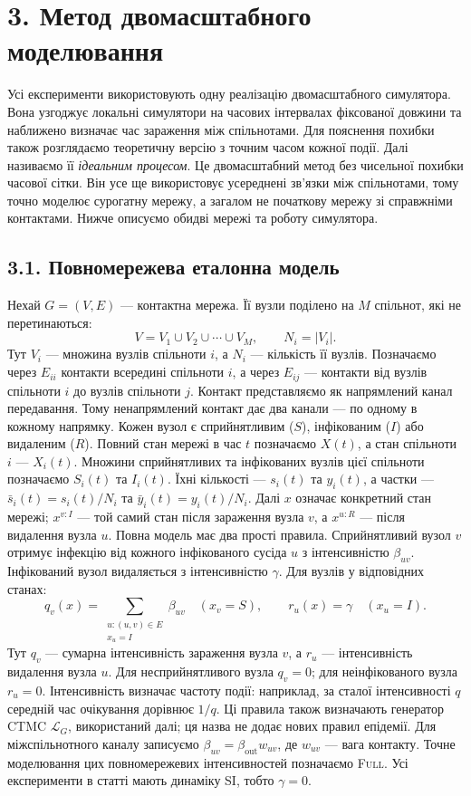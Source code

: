 ﻿\documentclass[11pt,a4paper]{article}
\newcommand{\ibar}{\bar{y}}
\newcommand{\sbar}{\bar{s}}
\newcommand{\Full}{\textup{\textsc{Full}}}
\begin{document}
\section*{3. Метод двомасштабного моделювання}
Усі експерименти використовують одну реалізацію двомасштабного симулятора. Вона узгоджує локальні симулятори на часових інтервалах фіксованої довжини та наближено визначає час зараження між спільнотами. Для пояснення похибки також розглядаємо теоретичну версію з точним часом кожної події. Далі називаємо її \emph{ідеальним процесом}. Це двомасштабний метод без чисельної похибки часової сітки. Він усе ще використовує усереднені зв'язки між спільнотами, тому точно моделює сурогатну мережу, а загалом не початкову мережу зі справжніми контактами. Нижче описуємо обидві мережі та роботу симулятора.
\subsection*{3.1. Повномережева еталонна модель}
Нехай $G=(V,E)$ --- контактна мережа. Її вузли поділено на $M$ спільнот, які не перетинаються:
\begin{equation*}V=V_1\cup V_2\cup\cdots\cup V_M,
\qquad N_i=|V_i|.\tag{1}
\end{equation*}
Тут $V_i$ --- множина вузлів спільноти $i$, а $N_i$ --- кількість її вузлів. Позначаємо через $E_{ii}$ контакти всередині спільноти $i$, а через $E_{ij}$ --- контакти від вузлів спільноти $i$ до вузлів спільноти $j$. Контакт представляємо як напрямлений канал передавання. Тому ненапрямлений контакт дає два канали --- по одному в кожному напрямку.
Кожен вузол є сприйнятливим ($S$), інфікованим ($I$) або видаленим ($R$). Повний стан мережі в час $t$ позначаємо $X(t)$, а стан спільноти $i$ --- $X_i(t)$. Множини сприйнятливих та інфікованих вузлів цієї спільноти позначаємо $S_i(t)$ та $I_i(t)$. Їхні кількості --- $s_i(t)$ та $y_i(t)$, а частки --- $\sbar_i(t)=s_i(t)/N_i$ та $\ibar_i(t)=y_i(t)/N_i$. Далі $x$ означає конкретний стан мережі; $x^{v:I}$ --- той самий стан після зараження вузла $v$, а $x^{u:R}$ --- після видалення вузла $u$.
Повна модель має два прості правила. Сприйнятливий вузол $v$ отримує інфекцію від кожного інфікованого сусіда $u$ з інтенсивністю $\beta_{uv}$. Інфікований вузол видаляється з інтенсивністю $\gamma$. Для вузлів у відповідних станах:
\begin{equation*}q_v(x)=\sum_{\substack{u:(u,v)\in E\\x_u=I}}\beta_{uv}
\quad (x_v=S),
\qquad r_u(x)=\gamma\quad (x_u=I).\tag{2}
\end{equation*}
Тут $q_v$ --- сумарна інтенсивність зараження вузла $v$, а $r_u$ --- інтенсивність видалення вузла $u$. Для несприйнятливого вузла $q_v=0$; для неінфікованого вузла $r_u=0$. Інтенсивність визначає частоту події: наприклад, за сталої інтенсивності $q$ середній час очікування дорівнює $1/q$. Ці правила також визначають генератор CTMC $\mathcal{L}_G$, використаний далі; ця назва не додає нових правил епідемії. Для міжспільнотного каналу записуємо $\beta_{uv}=\beta_{\mathrm{out}}w_{uv}$, де $w_{uv}$ --- вага контакту. Точне моделювання цих повномережевих інтенсивностей позначаємо \Full{}. Усі експерименти в статті мають динаміку SI, тобто $\gamma=0$.
\end{document}
